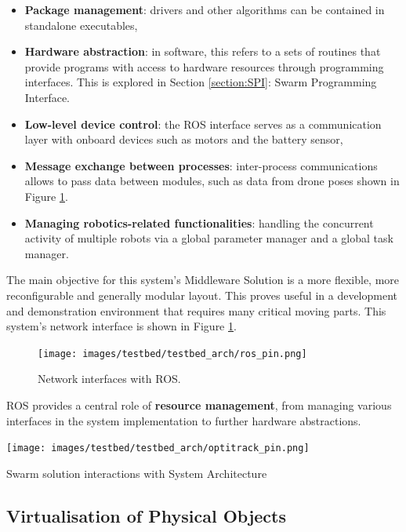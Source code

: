 \begin{itemize}
    \item \textbf{Package management}: drivers and other algorithms can be contained in standalone executables, 
    \item \textbf{Hardware abstraction}: in software, this refers to a sets of routines that provide programs with access to hardware resources through programming interfaces. This is explored in Section \ref{section:SPI}: Swarm Programming Interface.
    \item \textbf{Low-level device control}: the ROS interface serves as a communication layer with onboard devices such as motors and the battery sensor,    
    \item \textbf{Message exchange between processes}: inter-process communications allows to pass data between modules, such as data from drone poses shown in Figure \ref{fig:ROS_in_system}. 
    \item \textbf{Managing robotics-related functionalities}: handling the concurrent activity of multiple robots via a global parameter manager and a global task manager.
\end{itemize}  

The main objective for this system's Middleware Solution is a more flexible, more reconfigurable and generally modular layout. This proves useful in a development and demonstration environment that requires many critical moving parts. This system's network interface is shown in Figure \ref{fig:ROS_in_system}.

\begin{figure}[!h]
    \raggedright
    \texttt{[image: images/testbed/testbed\_arch/ros\_pin.png]}
    \caption{Network interfaces with ROS.}
    \label{fig:ROS_in_system}
\end{figure}

ROS provides a central role of \textbf{resource management}, from managing various interfaces in the system implementation to further hardware abstractions.

\begin{marginfigure}%
  \texttt{[image: images/testbed/testbed\_arch/optitrack\_pin.png]}
  \caption{Swarm solution interactions with System Architecture}
  \label{fig:optitrack_pin}
\end{marginfigure}

\subsection{Virtualisation of Physical Objects}\label{section:virtualisation}


